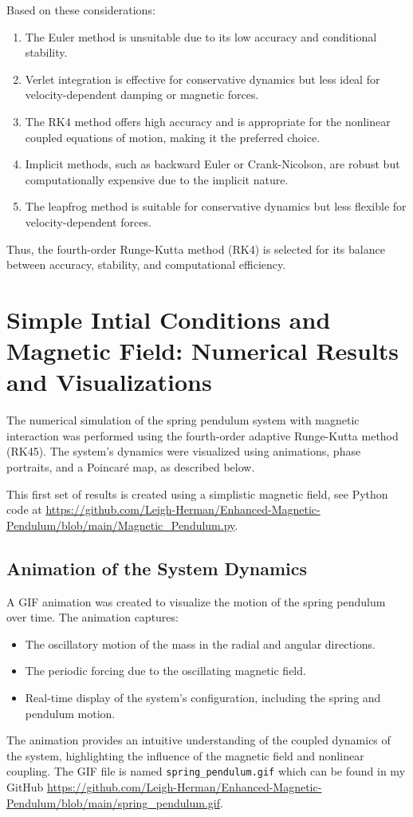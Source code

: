 \documentclass[12pt]{article}
\begin{document}
Based on these considerations:
\begin{enumerate}
    \item The Euler method is unsuitable due to its low accuracy and conditional stability.
    \item Verlet integration is effective for conservative dynamics but less ideal for velocity-dependent damping or magnetic forces.
    \item The RK4 method offers high accuracy and is appropriate for the nonlinear coupled equations of motion, making it the preferred choice.
    \item Implicit methods, such as backward Euler or Crank-Nicolson, are robust but computationally expensive due to the implicit nature.
    \item The leapfrog method is suitable for conservative dynamics but less flexible for velocity-dependent forces.
\end{enumerate}

Thus, the fourth-order Runge-Kutta method (RK4) is selected for its balance between accuracy, stability, and computational efficiency.

\section{Simple Intial Conditions and Magnetic Field: Numerical Results and Visualizations}

The numerical simulation of the spring pendulum system with magnetic interaction was performed using the fourth-order adaptive Runge-Kutta method (RK45). The system's dynamics were visualized using animations, phase portraits, and a Poincaré map, as described below.

This first set of results is created using a simplistic magnetic field, see Python code at \url{https://github.com/Leigh-Herman/Enhanced-Magnetic-Pendulum/blob/main/Magnetic_Pendulum.py}.

\subsection{Animation of the System Dynamics}
A GIF animation was created to visualize the motion of the spring pendulum over time. The animation captures:
\begin{itemize}
    \item The oscillatory motion of the mass in the radial and angular directions.
    \item The periodic forcing due to the oscillating magnetic field.
    \item Real-time display of the system's configuration, including the spring and pendulum motion.
\end{itemize}
The animation provides an intuitive understanding of the coupled dynamics of the system, highlighting the influence of the magnetic field and nonlinear coupling. The GIF file is named \texttt{spring\_pendulum.gif} which can be found in my GitHub \url{https://github.com/Leigh-Herman/Enhanced-Magnetic-Pendulum/blob/main/spring_pendulum.gif}.
\end{document}
